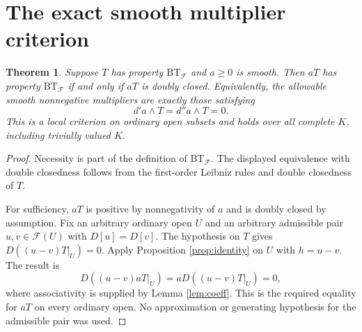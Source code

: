 \documentclass[11pt]{article}
\newtheorem{theorem}{Theorem}
\newcommand{\dp}{d'}
\newcommand{\ddp}{d''}
\newcommand{\BT}{\mathrm{BT}}
\begin{document}
\section{The exact smooth multiplier criterion}
\begin{theorem}\label{thm:criterion}
Suppose $T$ has property $\BT_{\mathcal F}$ and $a\geq0$ is smooth.
Then $aT$ has property $\BT_{\mathcal F}$ if and only if $aT$ is doubly
closed. Equivalently, the allowable smooth nonnegative multipliers are
exactly those satisfying
\[
 \dp a\wedge T=\ddp a\wedge T=0.
\]
This is a local criterion on ordinary open subsets and holds over all
complete $K$, including trivially valued $K$.
\end{theorem}
\begin{proof}
Necessity is part of the definition of $\BT_{\mathcal F}$. The displayed
equivalence with double closedness follows from the first-order Leibniz
rules and double closedness of $T$.

For sufficiency, $aT$ is positive by nonnegativity of $a$ and is doubly
closed by assumption. Fix an arbitrary ordinary open $U$ and an arbitrary
admissible pair $u,v\in\mathcal F(U)$ with $D[u]=D[v]$. The hypothesis
on $T$ gives $D((u-v)T|_U)=0$. Apply Proposition \ref{prop:identity}
on $U$ with $h=u-v$. The result is
\[
 D((u-v)aT|_U)=aD((u-v)T|_U)=0,
\]
where associativity is supplied by Lemma \ref{lem:coeff}. This is the
required equality for $aT$ on every ordinary open. No approximation or
generating hypothesis for the admissible pair was used.
\end{proof}
\end{document}
